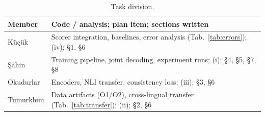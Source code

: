 \begin{table}[h]
\centering\small
\setlength{\tabcolsep}{3pt}
\begin{tabular}{@{}lp{}@{}}
\toprule
Member & Code / analysis; plan item; sections written \\
\midrule
K\"{u}\c{c}\"{u}k & Scorer integration, baselines, error analysis (Tab.~\ref{tab:errors}); (iv); \S1, \S6 \\
\c{S}ahin & Training pipeline, joint decoding, experiment runs; (i); \S4, \S5, \S7, \S8 \\
Okudurlar & Encoders, NLI transfer, consistency loss; (iii); \S3, \S6 \\
Tumurkhuu & Data artifacts (O1/O2), cross-lingual transfer (Tab.~\ref{tab:transfer}); (ii); \S2, \S6 \\
\bottomrule
\end{tabular}
\caption{Task division.}
\label{tab:plan}
\end{table}
